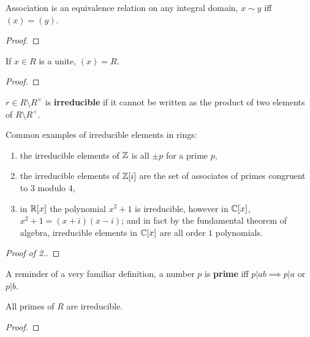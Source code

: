\documentclass{report}
\begin{document}
\begin{proposition}
    Association is an equivalence relation on any integral domain, $x\sim y$ iff $(x)=(y)$.
    \begin{proof}
        
    \end{proof}
\end{proposition}

\begin{proposition}
    If $x\in R$ is a unite, $(x)=R$. \begin{proof}
        
    \end{proof}
\end{proposition}

\begin{definition}[Irreducible]
    $r\in R\setminus R^\times$ is \textbf{irreducible} if it cannot be written as the product of two elements of $R\setminus R^\times$.
\end{definition}

\begin{examples}
    Common examples of irreducible elements in rings: \begin{enumerate}
        \item the irreducible elements of $\mathbb{Z}$ is all $\pm p$ for a prime $p$,
        \item the irreducible elements of $\mathbb{Z}[i]$ are the set of associates of primes congruent to $3$ modulo $4$,
        \item in $\mathbb{R}[x]$ the polynomial $x^2+1$ is irreducible, however in $\mathbb{C}[x]$, $x^2+1=(x+i)(x-i)$; and in fact by the fundamental theorem of algebra, irreducible elements in $\mathbb{C}[x]$ are all order $1$ polynomials.
    \end{enumerate}
    \begin{proof}[Proof of 2.]
        
    \end{proof}
\end{examples}

\begin{definition}
    A reminder of a very familiar definition, a number $p$ is \textbf{prime} iff $p|ab\implies p|a$ or $p|b$.
\end{definition}

\begin{lemma}
    All primes of $R$ are irreducible.\begin{proof}
        
    \end{proof}
\end{lemma}
\end{document}
